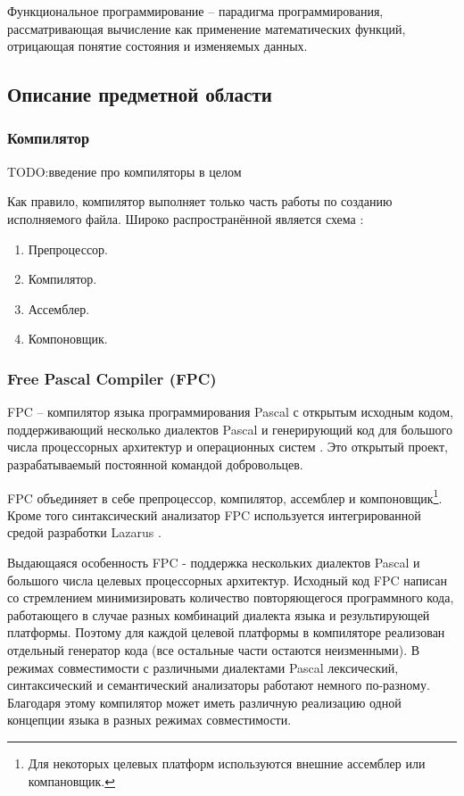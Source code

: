 \documentclass{imcs}
\begin{document}
Функциональное программирование -- парадигма программирования,
рассматривающая вычисление как применение математических функций,
отрицающая понятие состояния и изменяемых данных.


\subsection{Описание предметной области}

\subsubsection{Компилятор}

TODO:введение про компиляторы в целом

Как правило, компилятор выполняет только часть работы по созданию исполняемого файла.
Широко распространённой является схема \cite{dragonbook}:
\begin{enumerate}
    \item Препроцессор.
    \item Компилятор.
    \item Ассемблер.
    \item Компоновщик.
\end{enumerate}

\subsubsection{Free Pascal Compiler (FPC)}
FPC -- компилятор языка программирования Pascal с открытым исходным
кодом, поддерживающий несколько диалектов Pascal и генерирующий код для большого
числа процессорных архитектур и операционных систем \cite{fpc}. Это открытый проект,
разрабатываемый постоянной командой добровольцев.

FPC объединяет в себе препроцессор, компилятор, ассемблер и 
компоновщик\footnote{Для некоторых целевых платформ используются внешние ассемблер или компановщик.}.
Кроме того синтаксический анализатор FPC используется интегрированной средой разработки
Lazarus \cite{lazarus}.

Выдающаяся особенность FPC - поддержка нескольких диалектов Pascal 
и большого числа целевых процессорных архитектур. Исходный код FPC написан со
стремлением минимизировать количество повторяющегося программного кода,
работающего в случае разных комбинаций
диалекта языка и результирующей платформы. Поэтому для каждой целевой платформы
в компиляторе реализован отдельный генератор кода (все остальные части остаются
неизменными). В режимах совместимости с различными диалектами Pascal лексический,
синтаксический и семантический анализаторы работают немного по-разному. Благодаря этому
компилятор может иметь различную реализацию одной концепции языка в разных режимах
совместимости.
\end{document}
